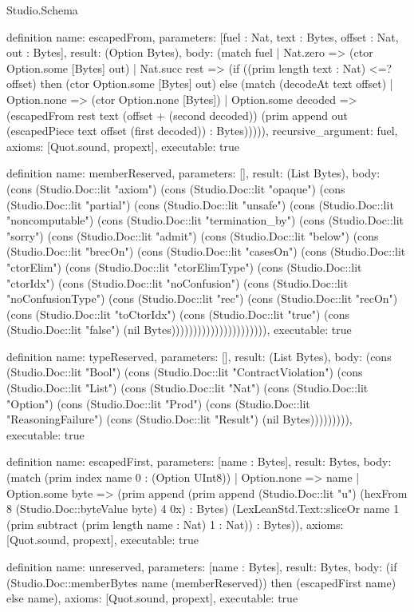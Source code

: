\begin{lexlean}{Studio.Schema}
\begin{semanticmodule}
definition{
  name: escapedFrom,
  parameters: [fuel : Nat, text : Bytes, offset : Nat, out : Bytes],
  result: (Option Bytes),
  body: (match fuel
    | Nat.zero => (ctor Option.some [Bytes] out)
    | Nat.succ rest => (if ((prim length text : Nat) <=? offset) then (ctor Option.some [Bytes] out) else (match (decodeAt text offset)
      | Option.none => (ctor Option.none [Bytes])
      | Option.some decoded => (escapedFrom rest text (offset + (second decoded)) (prim append out (escapedPiece text offset (first decoded)) : Bytes))))),
  recursive_argument: fuel,
  axioms: [Quot.sound, propext],
  executable: true
}

definition{
  name: memberReserved,
  parameters: [],
  result: (List Bytes),
  body: (cons (Studio.Doc::lit "axiom") (cons (Studio.Doc::lit "opaque") (cons (Studio.Doc::lit "partial") (cons (Studio.Doc::lit "unsafe") (cons (Studio.Doc::lit "noncomputable") (cons (Studio.Doc::lit "termination_by") (cons (Studio.Doc::lit "sorry") (cons (Studio.Doc::lit "admit") (cons (Studio.Doc::lit "below") (cons (Studio.Doc::lit "brecOn") (cons (Studio.Doc::lit "casesOn") (cons (Studio.Doc::lit "ctorElim") (cons (Studio.Doc::lit "ctorElimType") (cons (Studio.Doc::lit "ctorIdx") (cons (Studio.Doc::lit "noConfusion") (cons (Studio.Doc::lit "noConfusionType") (cons (Studio.Doc::lit "rec") (cons (Studio.Doc::lit "recOn") (cons (Studio.Doc::lit "toCtorIdx") (cons (Studio.Doc::lit "true") (cons (Studio.Doc::lit "false") (nil Bytes)))))))))))))))))))))),
  executable: true
}

definition{
  name: typeReserved,
  parameters: [],
  result: (List Bytes),
  body: (cons (Studio.Doc::lit "Bool") (cons (Studio.Doc::lit "ContractViolation") (cons (Studio.Doc::lit "List") (cons (Studio.Doc::lit "Nat") (cons (Studio.Doc::lit "Option") (cons (Studio.Doc::lit "Prod") (cons (Studio.Doc::lit "ReasoningFailure") (cons (Studio.Doc::lit "Result") (nil Bytes))))))))),
  executable: true
}

definition{
  name: escapedFirst,
  parameters: [name : Bytes],
  result: Bytes,
  body: (match (prim index name 0 : (Option UInt8))
    | Option.none => name
    | Option.some byte => (prim append (prim append (Studio.Doc::lit "u") (hexFrom 8 (Studio.Doc::byteValue byte) 4 0x) : Bytes) (LexLeanStd.Text::sliceOr name 1 (prim subtract (prim length name : Nat) 1 : Nat)) : Bytes)),
  axioms: [Quot.sound, propext],
  executable: true
}

definition{
  name: unreserved,
  parameters: [name : Bytes],
  result: Bytes,
  body: (if (Studio.Doc::memberBytes name (memberReserved)) then (escapedFirst name) else name),
  axioms: [Quot.sound, propext],
  executable: true
}


\end{semanticmodule}
\end{lexlean}
